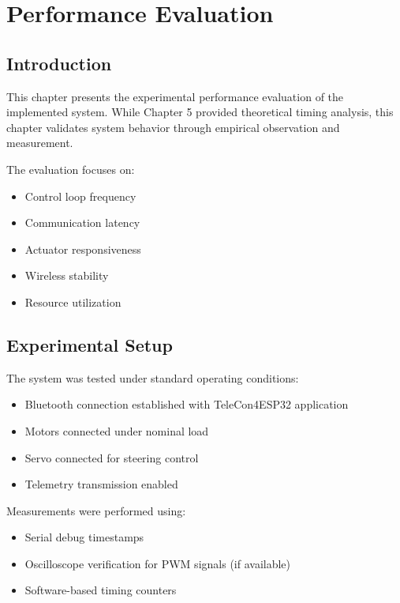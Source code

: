 \chapter{Performance Evaluation}

\section{Introduction}

This chapter presents the experimental performance evaluation of the implemented system. 
While Chapter 5 provided theoretical timing analysis, this chapter validates system behavior through empirical observation and measurement.

The evaluation focuses on:

\begin{itemize}
	\item Control loop frequency
	\item Communication latency
	\item Actuator responsiveness
	\item Wireless stability
	\item Resource utilization
\end{itemize}


\section{Experimental Setup}

The system was tested under standard operating conditions:

\begin{itemize}
	\item Bluetooth connection established with TeleCon4ESP32 application
	\item Motors connected under nominal load
	\item Servo connected for steering control
	\item Telemetry transmission enabled
\end{itemize}

Measurements were performed using:

\begin{itemize}
	\item Serial debug timestamps
	\item Oscilloscope verification for PWM signals (if available)
	\item Software-based timing counters
\end{itemize}

